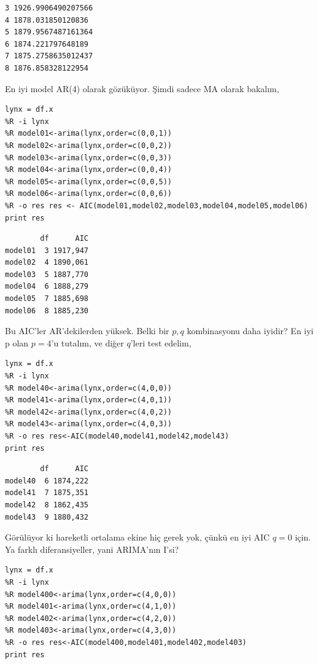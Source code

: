 \documentclass[12pt,fleqn]{article}\usepackage{../../common}
\begin{document}
\begin{verbatim}
3 1926.9906490207566
4 1878.031850120836
5 1879.9567487161364
6 1874.221797648189
7 1875.2758635012437
8 1876.858328122954
\end{verbatim}

En iyi model AR(4) olarak gözüküyor. Şimdi sadece MA olarak bakalım,

\begin{verbatim}
lynx = df.x
%R -i lynx
%R model01<-arima(lynx,order=c(0,0,1))
%R model02<-arima(lynx,order=c(0,0,2))
%R model03<-arima(lynx,order=c(0,0,3))
%R model04<-arima(lynx,order=c(0,0,4))
%R model05<-arima(lynx,order=c(0,0,5))
%R model06<-arima(lynx,order=c(0,0,6))
%R -o res res <- AIC(model01,model02,model03,model04,model05,model06)
print res
\end{verbatim}

\begin{verbatim}
        df      AIC
model01  3 1917,947
model02  4 1890,061
model03  5 1887,770
model04  6 1888,279
model05  7 1885,698
model06  8 1885,230

\end{verbatim}

Bu AIC'ler  AR'dekilerden yüksek. Belki bir $p,q$ kombinasyonu daha iyidir?
En iyi p olan $p=4$'u tutalım, ve diğer $q$'leri test edelim,

\begin{verbatim}
lynx = df.x
%R -i lynx
%R model40<-arima(lynx,order=c(4,0,0))
%R model41<-arima(lynx,order=c(4,0,1))
%R model42<-arima(lynx,order=c(4,0,2))
%R model43<-arima(lynx,order=c(4,0,3))
%R -o res res<-AIC(model40,model41,model42,model43)
print res
\end{verbatim}

\begin{verbatim}
        df      AIC
model40  6 1874,222
model41  7 1875,351
model42  8 1862,435
model43  9 1880,432

\end{verbatim}

Görülüyor ki hareketli ortalama ekine hiç gerek yok, çünkü en iyi AIC
$q=0$ için. Ya farklı diferansiyeller, yani ARIMA'nın I'si? 

\begin{verbatim}
lynx = df.x
%R -i lynx
%R model400<-arima(lynx,order=c(4,0,0))
%R model401<-arima(lynx,order=c(4,1,0))
%R model402<-arima(lynx,order=c(4,2,0))
%R model403<-arima(lynx,order=c(4,3,0))
%R -o res res<-AIC(model400,model401,model402,model403)
print res
\end{verbatim}
\end{document}
